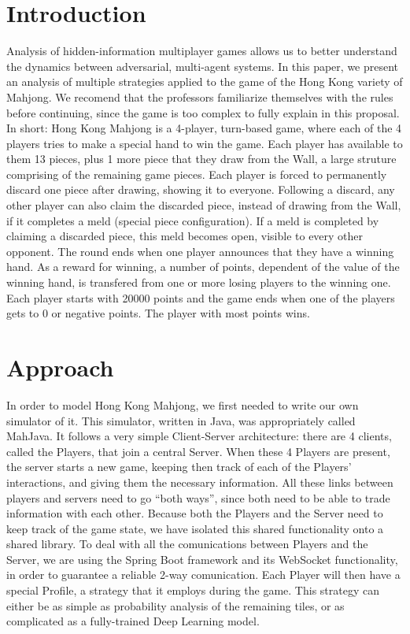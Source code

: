 \documentclass{acmart}
\begin{document}
\section{Introduction}
Analysis of hidden-information multiplayer games allows us to better understand the dynamics between adversarial, multi-agent systems. In this paper, we present
an analysis of multiple strategies applied to the game of the Hong Kong variety of Mahjong. We recomend that the professors familiarize themselves with
the rules\cite{hkmahjongrules} before continuing, since the game is too complex to fully explain in this proposal. In short: Hong Kong Mahjong is a 4-player,
turn-based game, where each of the 4 players tries to make a special hand to win the game. Each player has available to them 13 pieces, plus 1 more piece that they
draw from the Wall, a large struture comprising of the remaining game pieces. Each player is forced to permanently discard one piece after drawing, showing it to everyone. Following a discard, any other player can also claim the discarded piece, instead of drawing from the Wall, if it completes a meld (special piece configuration).
If a meld is completed by claiming a discarded piece, this meld becomes open, visible to every other opponent. The round ends when one player announces that they have a winning hand.
As a reward for winning, a number of points, dependent of the value of the winning hand, is transfered from one or more losing players to the winning one.
Each player starts with 20000 points and the game ends when one of the players gets to 0 or negative points. The player with most points wins.

\section{Approach}
In order to model Hong Kong Mahjong, we first needed to write our own simulator of it. This simulator, written in Java, was appropriately called MahJava. 
It follows a very simple Client-Server architecture: there are 4 clients, called the Players, that join a central Server. When these 4 Players are present,
the server starts a new game, keeping then track of each of the Players' interactions, and giving them the necessary information. All these links between players and
servers need to go ``both ways'', since both need to be able to trade information with each other. Because both the Players and the Server need to keep track of the
game state, we have isolated this shared functionality onto a shared library.
To deal with all the comunications between Players and the Server, we are using the Spring Boot framework\cite{springbootfw} and its WebSocket\cite{mdnwebsocket}
functionality, in order to guarantee a reliable 2-way comunication.
Each Player will then have a special Profile, a strategy that it employs during the game. This strategy can either be as simple as probability analysis of the remaining
tiles, or as complicated as a fully-trained Deep Learning model.
\end{document}
